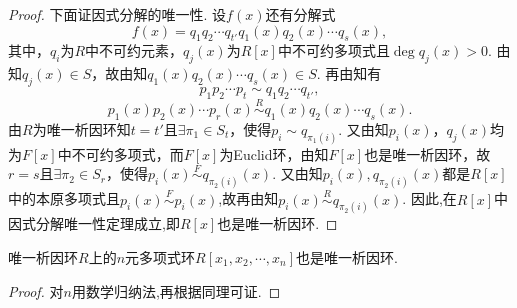 \documentclass[../../main.tex]{subfiles}%
\begin{document}
\begin{proof}
下面证因式分解的唯一性. 设$f(x)$还有分解式
\[
f(x) = q_1q_2\cdots q_{t'}q_1(x)q_2(x)\cdots q_s(x),
\]
其中，$q_i$为$R$中不可约元素，$q_j(x)$为$R[x]$中不可约多项式且$\deg q_j(x) > 0$. 由知$q_j(x) \in S$，故由知$q_1(x)q_2(x)\cdots q_s(x) \in S$. 再由知有
\[
p_1p_2\cdots p_t \sim q_1q_2\cdots q_{t'},
\]
\[
p_1(x)p_2(x)\cdots p_r(x) \stackrel{R}{\sim} q_1(x)q_2(x)\cdots q_s(x).
\]
由$R$为唯一析因环知$t = t'$且$\exists \pi_1 \in S_t$，使得$p_i \sim q_{\pi_1(i)}$. 又由知$p_i(x)$，$q_j(x)$均为$F[x]$中不可约多项式，而$F[x]$为Euclid环，由知$F[x]$也是唯一析因环，故$r = s$且$\exists \pi_2 \in S_r$，使得$p_i(x) \stackrel{F}{\sim} q_{\pi_2(i)}(x)$.
又由知$p_i(x),q_{\pi_2(i)}(x)$都是$R[x]$中的本原多项式且$p_i(x)\stackrel{F}{\sim} p_i(x)$,故再由知$p_i(x) \stackrel{R}{\sim} q_{\pi_2(i)}(x)$. 因此,在$R[x]$中因式分解唯一性定理成立,即$R[x]$也是唯一析因环.

\end{proof}

\begin{corollary}\label{corollary:抽象代数--推论2.7.1}
唯一析因环$R$上的$n$元多项式环$R[x_1, x_2, \cdots, x_n]$也是唯一析因环.
\end{corollary}
\begin{proof}

对$n$用数学归纳法,再根据同理可证.

\end{proof}
\end{document}
